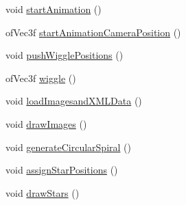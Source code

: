 \begin{DoxyCompactItemize}
\item 
void \hyperlink{group___camera_animation_ga79467453f6ea0dd63961a810dca9ac6a}{start\-Animation} ()
\item 
of\-Vec3f \hyperlink{group___camera_animation_ga1a97063e992528dc79867e516d9365f0}{start\-Animation\-Camera\-Position} ()
\item 
void \hyperlink{group___wiggle_gaaa5c2175be1d5ca404c3c23a898d0cdd}{push\-Wiggle\-Positions} ()
\item 
of\-Vec3f \hyperlink{group___wiggle_gacd718eb54b9dc2b45e463414c24de6b9}{wiggle} ()
\item 
void \hyperlink{classtest_app_aa93380112b906e2aac2d8738309b2d17}{load\-Imagesand\-X\-M\-L\-Data} ()
\item 
void \hyperlink{classtest_app_a6dbcb5f1e47c842dfd1ab6b188097677}{draw\-Images} ()
\item 
void \hyperlink{classtest_app_aa30f4f1db2d186466f97e6ca15169712}{generate\-Circular\-Spiral} ()
\item 
void \hyperlink{group___drawing_stars_ga57e6d61c73ba0244b9d7a8c227aec244}{assign\-Star\-Positions} ()
\item 
void \hyperlink{group___drawing_stars_ga3ea688a73ca9eb760a3f0a07fde0ac10}{draw\-Stars} ()
\end{DoxyCompactItemize}
